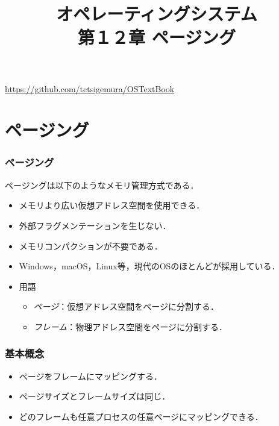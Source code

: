 \documentclass{beamer}                   %
\begin{document}
\title[ページング]
      {オペレーティングシステム\\第１２章 ページング}
\date{}
\begin{frame}
  \titlepage
  \centerline{\url{https://github.com/tctsigemura/OSTextBook}}
\end{frame}


\section{ページング}
\begin{frame}
  \frametitle{ページング}
  ページングは以下のようなメモリ管理方式である．
  \begin{itemize}
  \item メモリより広い仮想アドレス空間を使用できる．
  \item 外部フラグメンテーションを生じない．
  \item メモリコンパクションが不要である．
  \item Windows，macOS，Linux等，現代のOSのほとんどが採用している．
  \item 用語
    \begin{itemize}
      \item \emph{ページ}：仮想アドレス空間をページに分割する．
      \item \emph{フレーム}：物理アドレス空間をページに分割する．
    \end{itemize}
  \end{itemize}
\end{frame}

\begin{frame}
  \frametitle{基本概念}
  \begin{itemize}
  \item ページをフレームにマッピングする．
  \item ページサイズとフレームサイズは同じ．
  \item どのフレームも任意プロセスの任意ページにマッピングできる．
  \end{itemize}
\end{frame}
\end{document}
